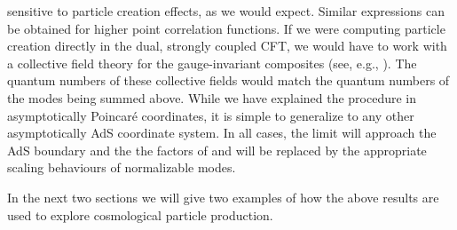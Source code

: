 \documentclass[a4paper,aps,prd,preprintnumbers,groupedaddress]{revtex4}
\begin{document}
sensitive to particle creation effects, as we would expect. Similar expressions can be obtained for higher point correlation functions.  If we were computing particle creation directly in the dual, strongly coupled
CFT, we would have to work with a collective field theory for the gauge-invariant composites (see, e.g., \cite{vijay99}). The quantum
numbers of these collective fields would match the quantum numbers of the modes being summed above.   While we have explained the procedure
in asymptotically Poincar\'{e} coordinates, it is simple to generalize to any other asymptotically AdS coordinate system.   In all cases,
the limit will approach the AdS boundary and the the factors of \myHighlight{$\epsilon$}\coordHE{} and \coordHE{} will be replaced by the appropriate scaling behaviours of
normalizable modes.

In the next two sections we will give two examples of how the above results are used to explore cosmological particle production.
\end{document}
